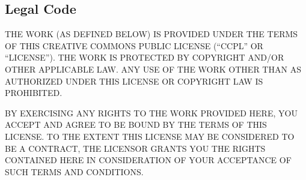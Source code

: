 \documentclass[12pt,letterpaper,oneside,final]{memoir}
\begin{document}
\begin{appendices}
\section{Legal Code}
\label{legal-code}

THE WORK (AS DEFINED BELOW) IS PROVIDED UNDER THE TERMS OF THIS CREATIVE COMMONS PUBLIC LICENSE (``CCPL'' OR ``LICENSE''). THE WORK IS PROTECTED BY COPYRIGHT AND/OR OTHER APPLICABLE LAW. ANY USE OF THE WORK OTHER THAN AS AUTHORIZED UNDER THIS LICENSE OR COPYRIGHT LAW IS PROHIBITED.

BY  EXERCISING ANY RIGHTS TO THE WORK PROVIDED HERE, YOU ACCEPT AND AGREE TO BE BOUND BY THE TERMS OF THIS LICENSE. TO THE EXTENT THIS LICENSE MAY BE CONSIDERED TO BE A CONTRACT, THE LICENSOR GRANTS YOU THE RIGHTS CONTAINED HERE IN CONSIDERATION OF YOUR ACCEPTANCE OF SUCH TERMS AND CONDITIONS.


\end{appendices}
\end{document}
